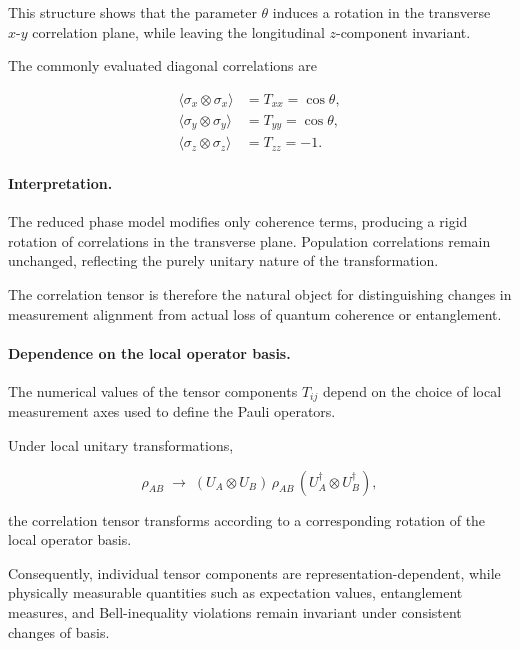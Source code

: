 This structure shows that the parameter \( \theta \) induces a rotation in the transverse \( x\text{-}y \) correlation plane, while leaving the longitudinal \( z \)-component invariant.

\medskip

The commonly evaluated diagonal correlations are

\begin{align}
\langle \sigma_x \otimes \sigma_x \rangle
&=
T_{xx}
=
\cos\theta,
\nonumber
\\
\langle \sigma_y \otimes \sigma_y \rangle
&=
T_{yy}
=
\cos\theta,
\nonumber
\\
\langle \sigma_z \otimes \sigma_z \rangle
&=
T_{zz}
=
-1.
\label{eq:phase_model_diagonal_correlations}
\end{align}

\medskip

\paragraph{Interpretation.}

The reduced phase model modifies only coherence terms, producing a rigid rotation of correlations in the transverse plane. Population correlations remain unchanged, reflecting the purely unitary nature of the transformation.

The correlation tensor is therefore the natural object for distinguishing changes in measurement alignment from actual loss of quantum coherence or entanglement.

\medskip

\paragraph{Dependence on the local operator basis.}

The numerical values of the tensor components \( T_{ij} \) depend on the choice of local measurement axes used to define the Pauli operators.

Under local unitary transformations,

\[
\rho_{AB}
\;\rightarrow\;
(U_A \otimes U_B)\,
\rho_{AB}\,
(U_A^\dagger \otimes U_B^\dagger),
\]

the correlation tensor transforms according to a corresponding rotation of the local operator basis.

Consequently, individual tensor components are representation-dependent, while physically measurable quantities such as expectation values, entanglement measures, and Bell-inequality violations remain invariant under consistent changes of basis.

